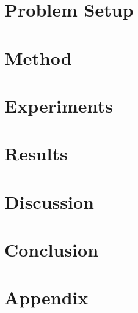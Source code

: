 \documentclass{article}
\newif\ificml
\begin{document}
\section{Problem Setup}


\section{Method}


\section{Experiments}


\section{Results}


\section{Discussion}


\section{Conclusion}


\appendix
\section{Appendix}


\ificml
  \IfFileExists{icml2026.bst}{}{}
\else
  
\fi

\end{document}
